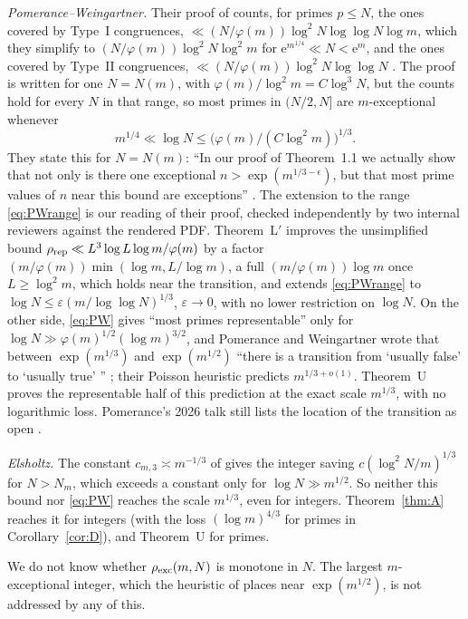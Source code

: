 \documentclass[10pt,reqno]{amsart}
\theoremstyle{definition}
\newcommand{\e}{\mathrm e}
\begin{document}
\emph{Pomerance--Weingartner.}  Their proof of \cite[Thm.~3.1]{PW}
counts, for primes $p\leq N$, the ones covered by Type~I congruences,
$\ll(N/\varphi(m))\log^2N\log\log N\log m$, which they simplify to
$(N/\varphi(m))\log^2N\log^2m$ for $\e^{m^{1/4}}\ll N<\e^m$, and the ones
covered by Type~II congruences, $\ll(N/\varphi(m))\log^2N\log\log N$
\cite[pp.~6--8]{PW}.  The proof is written for one $N=N(m)$, with
$\varphi(m)/\log^2m=C\log^3N$, but the counts hold for every $N$ in that
range, so most primes in $(N/2,N]$ are $m$-exceptional whenever
\begin{equation}\label{eq:PWrange}
 m^{1/4}\ll\log N\leq\bigl(\varphi(m)/(C\log^2m)\bigr)^{1/3}.
\end{equation}
They state this for $N=N(m)$: ``In our proof of Theorem~1.1 we actually
show that not only is there one exceptional $n>\exp(m^{1/3-\epsilon})$,
but that most prime values of $n$ near this bound are exceptions''
\cite[p.~2]{PW}.  The extension to the range \eqref{eq:PWrange} is our
reading of their proof, checked independently by two internal reviewers
against the rendered PDF.  Theorem~L$'$ improves the unsimplified bound
$\rho_{\rm rep}\ll L^3\log L\log m/\varphi(m)$ by a factor
$(m/\varphi(m))\min(\log m,L/\log m)$, a full $(m/\varphi(m))\log m$ once $L\geq\log^2m$, which holds
near the transition, and extends \eqref{eq:PWrange} to
$\log N\leq\varepsilon(m/\log\log N)^{1/3}$, $\varepsilon\to0$,
with no lower restriction on $\log N$.  On the other side,
\eqref{eq:PW} gives ``most primes representable'' only for
$\log N\gg\varphi(m)^{1/2}(\log m)^{3/2}$, %
and Pomerance and Weingartner wrote
that between $\exp(m^{1/3})$ and $\exp(m^{1/2})$ ``there is a transition
from `usually false' to `usually true' '' \cite[p.~2]{PW}; their
Poisson heuristic \cite[p.~3]{PW} predicts $m^{1/3+o(1)}$.  Theorem~U
proves the representable half of this prediction at the exact scale
$m^{1/3}$, with no logarithmic loss.  Pomerance's 2026 talk still lists
the location of the transition as open \cite{Pom26}.

\emph{Elsholtz.}  The constant $c_{m,3}\asymp m^{-1/3}$ of
\cite[Rem.~7.3]{Els} gives the integer saving
$c(\log^2N/m)^{1/3}$ for $N>N_m$, which exceeds a constant only for
$\log N\gg m^{1/2}$.  So neither this bound nor \eqref{eq:PW} reaches the
scale $m^{1/3}$, even for integers.  Theorem~\ref{thm:A} reaches it for
integers (with the loss $(\log m)^{4/3}$ for primes in
Corollary~\ref{cor:D}), and Theorem~U for primes.

We do not know whether $\rho_{\rm exc}(m,N)$ is monotone in $N$.  The
largest $m$-exceptional integer, which the heuristic of \cite[p.~3]{PW}
places near $\exp(m^{1/2})$, is not addressed by any of this.
\end{document}
